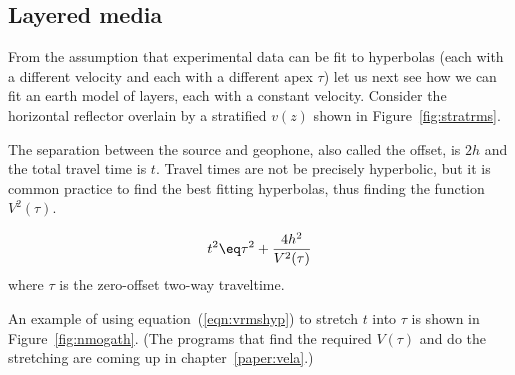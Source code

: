 \subsection{Layered media}
\par
From the assumption that experimental data
can be fit to hyperbolas
(each with a different velocity and each with a different apex $\tau$)
let us next see how
we can fit an earth model of layers,
each with a constant velocity.
Consider the  horizontal reflector
overlain by a stratified  $v(z)$
shown in Figure~\ref{fig:stratrms}.%

The separation between the source and geophone,
also called the offset, is $2h$ and the total travel time is $t$.
Travel times are not be precisely hyperbolic,
but it is common practice to find the best fitting hyperbolas,
thus finding the function $V^2(\tau)$.

\begin{equation}
t^2 \eq \tau^2 + \frac{4h^2}{V^2(\tau)}
\label{eqn:vrmshyp}
\end{equation}
where $\tau$ is the zero-offset two-way traveltime.

\par
An example of using equation~(\ref{eqn:vrmshyp})
to stretch $t$ into $\tau$
is shown in Figure~\ref{fig:nmogath}.
(The programs that
find the required $V(\tau )$ and do the stretching are coming up in
chapter~\ref{paper:vela}.)


